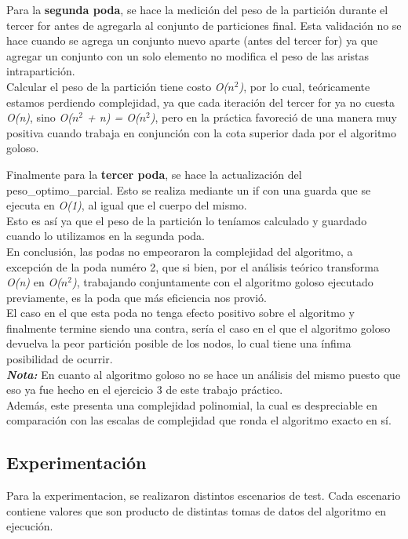 \documentclass[10pt,a4paper]{article}
\begin{document}
Para la \textbf{segunda poda}, se hace la medición del peso de la partición durante el tercer for antes de agregarla al conjunto de particiones final. Esta validación no se hace cuando se agrega un conjunto nuevo aparte (antes del tercer for) ya que agregar un conjunto con un solo elemento no modifica el peso de las aristas intrapartición.\\
Calcular el peso de la partición tiene costo \textit{O($n^2$)}, por lo cual, teóricamente estamos perdiendo complejidad, ya que cada iteración del tercer for ya no cuesta \textit{O(n)}, sino \textit{O($n^2$ + n) = O($n^2$)}, pero en la práctica favoreció de una manera muy positiva cuando trabaja en conjunción con la cota superior dada por el algoritmo goloso.

Finalmente para la \textbf{tercer poda}, se hace la actualización del peso\_optimo\_parcial. Esto se realiza mediante un if con una guarda que se ejecuta en \textit{O(1)}, al igual que el cuerpo del mismo.\\
Esto es así ya que el peso de la partición lo teníamos calculado y guardado cuando lo utilizamos en la segunda poda.\\

\noindent En conclusión, las podas no empeoraron la complejidad del algoritmo, a excepción de la poda numéro 2, que si bien, por el análisis teórico transforma \textit{O(n)} en \textit{O($n^2$)}, trabajando conjuntamente con el algoritmo goloso ejecutado previamente, es la poda que más eficiencia nos provió.\\
El caso en el que esta poda no tenga efecto positivo sobre el algoritmo y finalmente termine siendo una contra, sería el caso en el que el algoritmo goloso devuelva la peor partición posible de los nodos, lo cual tiene una ínfima posibilidad de ocurrir.\\

\noindent \textbf{\textit{Nota: }} En cuanto al algoritmo goloso no se hace un análisis del mismo puesto que eso ya fue hecho en el ejercicio 3 de este trabajo práctico.\\Además, este presenta una complejidad polinomial, la cual es despreciable en comparación con las escalas de complejidad que ronda el algoritmo exacto en sí.




  
\newpage
\subsection{Experimentación}
Para la experimentacion, se realizaron distintos escenarios de test. Cada escenario contiene valores que son producto de distintas tomas de datos del algoritmo en ejecución.
\end{document}
